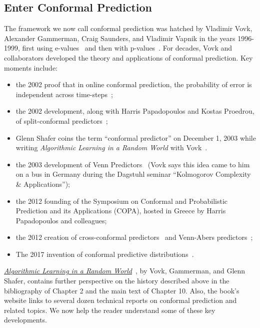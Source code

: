 \documentclass[10pt]{article}
\begin{document}
\subsection*{Enter Conformal Prediction}
The framework we now call conformal prediction was hatched by Vladimir Vovk, Alexander Gammerman, Craig Saunders, and Vladimir Vapnik in the years 1996-1999, first using e-values~\cite{gammerman1998learning} and then with p-values~\cite{saunders1999transduction, vovk1999machine}.
For decades, Vovk and collaborators developed the theory and applications of conformal prediction.
Key moments include:
\begin{itemize}
    \item the 2002 proof that in online conformal prediction, the probability of error is independent across time-steps~\cite{vovk2002line};
    \item the 2002 development, along with Harris Papadopoulos and Kostas Proedrou, of split-conformal predictors~\cite{papadopoulos2002inductive};
    \item Glenn Shafer coins the term ``conformal predictor'' on December 1, 2003 while writing \emph{Algorithmic Learning in a Random World} with Vovk~\cite{vovk2005algorithmic}.
    \item the 2003 development of Venn Predictors~\cite{vovk2003self} (Vovk says this idea came to him on a bus in Germany during the Dagstuhl seminar ``Kolmogorov Complexity \& Applications'');
    \item the 2012 founding of the Symposium on Conformal and Probabilistic Prediction and its Applications (COPA), hosted in Greece by Harris Papadopoulos and colleagues;
    \item the 2012 creation of cross-conformal predictors~\cite{vovk2015cross} and Venn-Abers predictors~\cite{vovk2012venn};
    \item The 2017 invention of conformal predictive distributions~\cite{vovk2017nonparametric}.
\end{itemize}
\href{http://alrw.net/}{\emph{Algorithmic Learning in a Random World}}~\cite{vovk2005algorithmic}, by Vovk, Gammerman, and Glenn Shafer, contains further perspective on the history described above in the bibliography of Chapter 2 and the main text of Chapter 10.
Also, the book's website links to several dozen technical reports on conformal prediction and related topics.
We now help the reader understand some of these key developments.
\end{document}
